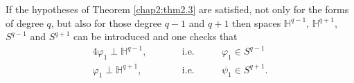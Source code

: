 \begin{remark*}
  If the hypotheses of Theorem \ref{chap2:thm2.3} are satisfied, not only for the
  forms of degree $q$, but also for those degree $q-1$ and  $q+1$ then
  spaces $\mathbb{H}^{q-1}$, $\mathbb{H}^{q+1}$, $S^{q-1}$ and $S^{q+1}$ can
  be introduced and one checks that  
  \begin{alignat*}{4}
    \varphi_1\perp \mathbb{H}^{q-1}, & \qquad & \text{i.e.} &\qquad
    \varphi_1 \in S^{q-1}\\ 
    \varphi _1\perp \mathbb{H}^{q+1}, && \text{i.e.} &\qquad \psi _1
    \in S^{q+1}. 
  \end{alignat*}
\end{remark*}
